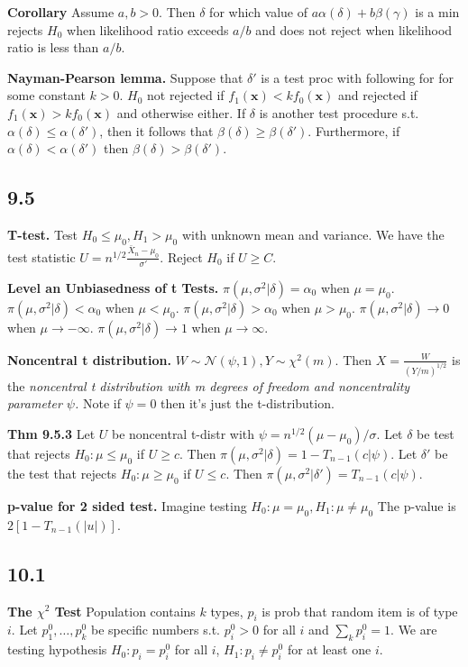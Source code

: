 \documentclass{article}
\newcommand{\norm}[2]{\mathcal{N}(#1, #2)}
\begin{document}
\textbf{Corollary}
Assume $a, b > 0$. Then $\delta$ for which value of 
$a\alpha(\delta) + b\beta(\gamma)$ is a min rejects $H_0$ when likelihood
ratio exceeds $a/b$ and does not reject when likelihood ratio is less than
$a/b$.

\textbf{Nayman-Pearson lemma.}
Suppose that $\delta'$ is a test proc with following for for some constant $k > 0$.
$H_0$ not rejected if $f_1(\bm{x}) < kf_0(\bm{x})$ and rejected if 
$f_1(\bm{x}) > kf_0(\bm{x})$ and otherwise either. If $\delta$ is another test
procedure s.t. $\alpha(\delta) \leq \alpha(\delta')$, then it follows that
$\beta(\delta) \geq \beta(\delta')$. Furthermore, if $\alpha(\delta) < \alpha(\delta')$
then $\beta(\delta) > \beta(\delta')$.

\subsection*{9.5}
\textbf{T-test.}
Test $H_0 \leq \mu_0, H_1 > \mu_0$ with unknown mean and variance. We have the 
test statistic $U = n^{1/2}\frac{\bar{X}_n - \mu_0}{\sigma'}$. Reject $H_0$
if $U \geq C$. 

\textbf{Level an Unbiasedness of t Tests.}
$\pi(\mu, \sigma^2 | \delta) = \alpha_0$ when $\mu = \mu_0$.
$\pi(\mu, \sigma^2 | \delta) < \alpha_0$ when $\mu < \mu_0$.
$\pi(\mu, \sigma^2 | \delta) > \alpha_0$ when $\mu > \mu_0$.
$\pi(\mu, \sigma^2 | \delta) \to 0$ when $\mu \to -\infty$.
$\pi(\mu, \sigma^2 | \delta) \to 1$ when $\mu \to \infty$.

\textbf{Noncentral t distribution.}
$W \sim \norm{\psi}{1}, Y \sim \chi^2(m)$. Then
$X = \frac{W}{(Y/m)^{1/2}}$ is the \textit{noncentral t distribution with m
degrees of freedom and noncentrality parameter $\psi$.} Note if $\psi = 0$
then it's just the t-distribution.

\textbf{Thm 9.5.3}
Let $U$ be noncentral t-distr with $\psi = n^{1/2}(\mu - \mu_0)/\sigma$. Let
$\delta$ be test that rejects $H_0: \mu \leq \mu_0$ if $U \geq c$. Then
$\pi(\mu, \sigma^2 | \delta) = 1 - T_{n-1}(c|\psi)$. Let $\delta'$ be the
test that rejects $H_0: \mu \geq \mu_0$ if $U \leq c$. Then
$\pi(\mu, \sigma^2 | \delta') = T_{n-1}(c | \psi)$.

\textbf{p-value for 2 sided test.}
Imagine testing $H_0: \mu = \mu_0, H_1: \mu \neq \mu_0$
The p-value is $2[1 - T_{n-1}(|u|)]$.


\subsection*{10.1}
\textbf{The $\chi^2$ Test}
Population contains $k$ types, $p_i$ is prob that random item is of type $i$.
Let $p_1^0,\dots, p_k^0$ be specific numbers s.t. $p_i^0 > 0$ for all $i$
and $\sum_k p_i^0 = 1$. We are testing hypothesis 
$H_0: p_i = p_i^0$ for all $i$, $H_1: p_i \neq p_i^0$ for at least one $i$.
\end{document}
